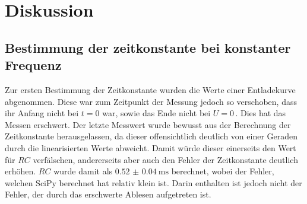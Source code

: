 \section{Diskussion}
\label{sec:Diskussion}
\subsection{Bestimmung der zeitkonstante bei konstanter Frequenz}
Zur ersten Bestimmung der Zeitkonstante wurden die Werte einer Entladekurve abgenommen.
Diese war zum Zeitpunkt der Messung jedoch so verschoben, dass ihr Anfang nicht bei $t=0$
war, sowie das Ende nicht bei $U=0$\,. Dies hat das Messen erschwert. Der letzte Messwert
wurde bewusst aus der Berechnung der Zeitkonstante herausgelassen, da dieser offensichtlich 
deutlich von einer Geraden durch die linearisierten Werte abweicht. Damit würde dieser einerseits
den Wert für $RC$ verfälschen, andererseits aber auch den Fehler der Zeitkonstante deutlich
erhöhen. $RC$ wurde damit als $\qty{0,52(0.04)}{\milli\second}$ berechnet, wobei der Fehler,
welchen SciPy berechnet hat relativ klein ist. Darin enthalten ist jedoch nicht der Fehler, der 
durch das erschwerte Ablesen aufgetreten ist. 
